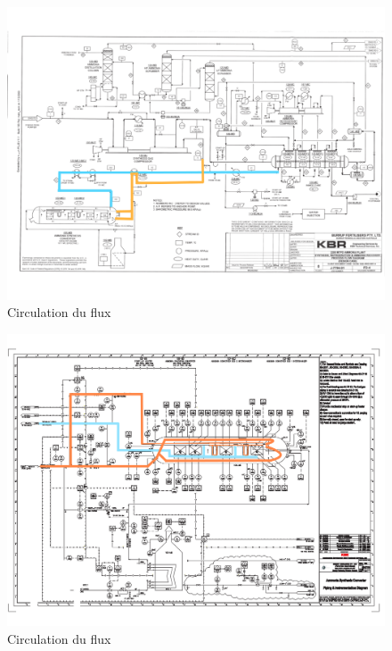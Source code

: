 \documentclass[a4paper,12pt, oneside]{article}
\begin{document}
\begin{figure}[h]
	\includegraphics[scale=0.6]{Plan1.png}
	\caption{Circulation du flux}
	\label{cir1}
	\end{figure}
\begin{figure}[h]
	\includegraphics[scale=0.5]{Plan2.png}
	\caption{Circulation du flux}
	\label{cir2}
\end{figure}
\end{document}
